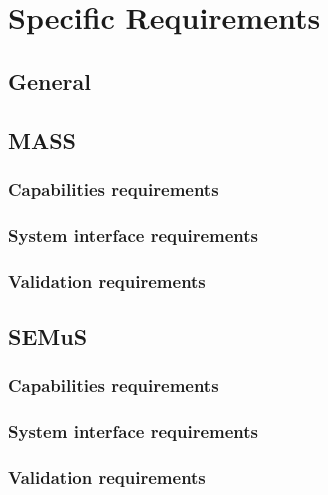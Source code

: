 
\chapter{Specific Requirements}

\section{General}

\section{MASS}

\subsection{Capabilities requirements}

\subsection{System interface requirements}

\subsection{Validation requirements}

\section{SEMuS}

\subsection{Capabilities requirements}

\subsection{System interface requirements}

\subsection{Validation requirements}